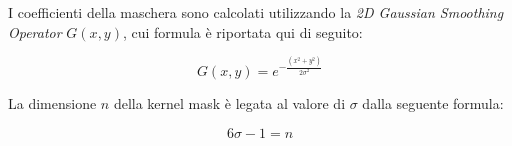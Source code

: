 \pagebreak

I coefficienti della maschera sono calcolati utilizzando la \emph{2D Gaussian Smoothing Operator} $G(x,y)$, cui formula è riportata qui di seguito:

\begin{equation}
G(x, y) = e^{- \frac{(x^2 + y^2)}{2\sigma^2}}
\end{equation}

La dimensione $n$ della kernel mask è legata al valore di $\sigma$ dalla seguente formula:

\begin{equation}
6\sigma - 1 = n
\end{equation}

